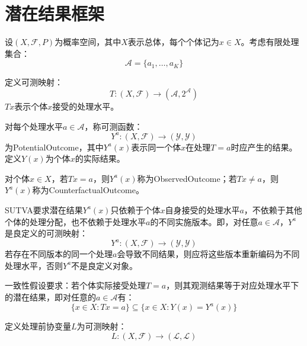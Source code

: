 \section{潜在结果框架}

设$(X,\mathscr{F},P)$为概率空间，其中$X$表示总体，每个个体记为$x\in X$。考虑有限处理集合：
\begin{equation*}
	\mathcal{A}=\{a_1,\ldots,a_K\}
\end{equation*}
\begin{definition}
	定义可测映射：
	\begin{equation*}
		T:(X,\mathscr{F})\to(\mathcal{A},2^{\mathcal{A}})
	\end{equation*}
	$Tx$表示个体$x$接受的处理水平。
\end{definition}
\begin{definition}
	对每个处理水平$a\in\mathcal{A}$，称可测函数：
	\begin{equation*}
		Y^a:(X,\mathscr{F})\to(\mathcal{Y},\mathscr{Y})
	\end{equation*}
	为\gls{PotentialOutcome}，其中$Y^a(x)$表示同一个体$x$在处理$T=a$时应产生的结果。定义$Y(x)$为个体$x$的实际结果。
\end{definition}
\begin{definition}
	对个体$x\in X$，若$Tx=a$，则$Y^a(x)$称为\gls{ObservedOutcome}；若$Tx\neq a$，则$Y^a(x)$称为\gls{CounterfactualOutcome}。
\end{definition}
\begin{definition}[稳定个体处理值假设]
	\gls{SUTVA}要求潜在结果$Y^a(x)$只依赖于个体$x$自身接受的处理水平$a$，不依赖于其他个体的处理分配，也不依赖于处理水平$a$的不同实施版本。即，对任意$a\in\mathcal{A}$，$Y^a$是良定义的可测映射：
	\begin{equation*}
		Y^a:(X,\mathscr{F})\to(\mathcal{Y},\mathscr{Y})
	\end{equation*}
	若存在不同版本的同一个处理$a$会导致不同结果，则应将这些版本重新编码为不同处理水平，否则$Y^a$不是良定义对象。
\end{definition}
\begin{definition}[一致性假设]
	一致性假设要求：若个体实际接受处理$T=a$，则其观测结果等于对应处理水平下的潜在结果，即对任意的$a\in\mathcal{A}$有：
	\begin{equation*}
		\{x\in X:Tx=a\}\subseteq\{x\in X:Y(x)=Y^a(x)\}
	\end{equation*}
\end{definition}
\begin{definition}
	定义处理前协变量$L$为可测映射：
	\begin{equation*}
		L:(X,\mathscr{F})\to(\mathcal{L},\mathscr{L})
	\end{equation*}
\end{definition}
